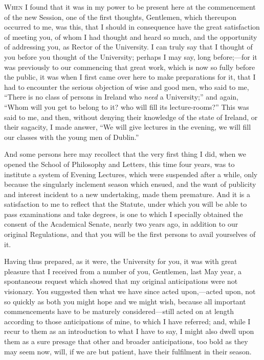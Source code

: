 W\textsc{hen} I found that it was in my power to be present here at
the commencement of the new Session, one of the first thoughts,
Gentlemen, which thereupon occurred to me, was this, that I should in
consequence have the great satisfaction of meeting you, of whom I had
thought and heard so much, and the opportunity of addressing you, as
Rector of the University. I can truly say that I thought of you before
you thought of the University; perhaps I may say, long before;—for
it was previously to our commencing that great work, which is now so
fully before the public, it was when I first came over here to make
preparations for it, that I had to encounter the serious objection of
wise and good men, who said to me, ``There is no class of persons
in Ireland who \emph{need} a University;'' and again, ``Whom
will you get to belong to it? who will fill its lecture-rooms?''
This was said to me, and then, without denying their knowledge of the
state of Ireland, or their sagacity, I made answer, ``We will give
lectures in the evening, we will fill our classes with the young men
of Dublin.''

And some persons here may recollect that the very first thing
I did, when we opened the School of Philosophy and Letters, this time
four years, was to institute a system of Evening Lectures, which were
suspended after a while, only because the singularly inclement season
which ensued, and the want of publicity and interest incident to a new
undertaking, made them premature. And it is a satisfaction to me to
reflect that the Statute, under which you will be able to pass
examinations and take degrees, is one to which I specially obtained
the consent of the Academical Senate, nearly two years ago, in
addition to our original Regulations, and that you will be the first
persons to avail yourselves of it.

Having thus prepared, as it were, the University for you, it was
with great pleasure that I received from a number of you, Gentlemen,
last May year, a spontaneous request which showed that my original
anticipations were not visionary. You suggested then what we have
since acted upon,—acted upon, not so quickly as both you might hope
and we might wish, because all important commencements have to be
maturely considered—still acted on at length according to those
anticipations of mine, to which I have referred; and, while I recur to
them as an introduction to what I have to say, I might also dwell upon
them as a sure presage that other and broader anticipations, too bold
as they may seem now, will, if we are but patient, have their
fulfilment in their season.

